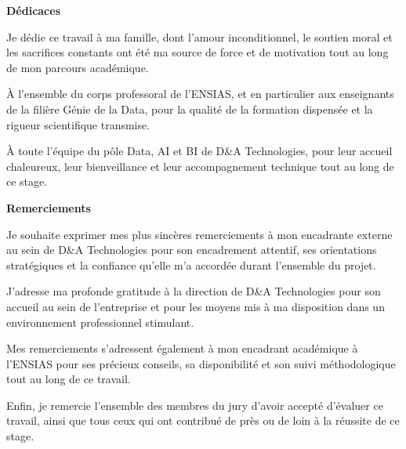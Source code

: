 \documentclass[a4paper,12pt]{report}
\begin{document}
\newpage
\thispagestyle{empty}
\begin{center}
    \textbf{\huge{Dédicaces}}
\end{center}
\vspace{1.5cm}

\begin{doublespace}
\large
\hspace*{1cm}Je dédie ce travail à ma famille, dont l'amour inconditionnel, le soutien moral et les sacrifices constants ont été ma source de force et de motivation tout au long de mon parcours académique.

\noindent À l'ensemble du corps professoral de l'ENSIAS, et en particulier aux enseignants de la filière Génie de la Data, pour la qualité de la formation dispensée et la rigueur scientifique transmise.

\noindent À toute l'équipe du pôle Data, AI et BI de D\&A Technologies, pour leur accueil chaleureux, leur bienveillance et leur accompagnement technique tout au long de ce stage.
\end{doublespace}

\newpage
\thispagestyle{empty}
\begin{center}
    \textbf{\huge{Remerciements}}
\end{center}
\vspace{1.5cm}

\begin{doublespace}
\large
\hspace{1cm}Je souhaite exprimer mes plus sincères remerciements à mon encadrante externe au sein de D\&A Technologies pour son encadrement attentif, ses orientations stratégiques et la confiance qu'elle m'a accordée durant l'ensemble du projet.

\noindent J'adresse ma profonde gratitude à la direction de D\&A Technologies pour son accueil au sein de l'entreprise et pour les moyens mis à ma disposition dans un environnement professionnel stimulant.

\noindent Mes remerciements s'adressent également à mon encadrant académique à l'ENSIAS pour ses précieux conseils, sa disponibilité et son suivi méthodologique tout au long de ce travail.

\noindent Enfin, je remercie l'ensemble des membres du jury d'avoir accepté d'évaluer ce travail, ainsi que tous ceux qui ont contribué de près ou de loin à la réussite de ce stage.
\end{doublespace}
\end{document}
